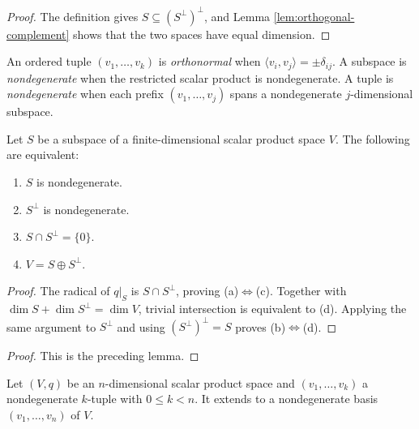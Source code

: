 \begin{proof}
\leanok
{}
\sketch The definition gives $S\subseteq(S^\perp)^\perp$, and Lemma
\ref{lem:orthogonal-complement} shows that the two spaces have equal dimension.
\end{proof}

An ordered tuple $(v_1,\ldots,v_k)$ is \emph{orthonormal} when
$\langle v_i,v_j\rangle=\pm\delta_{ij}$. A subspace is \emph{nondegenerate} when
the restricted scalar product is nondegenerate. A tuple is \emph{nondegenerate}
when each prefix $(v_1,\ldots,v_j)$ spans a nondegenerate $j$-dimensional
subspace.

\begin{lemma}\label{lem:nondegenerate-subspace}
\leanok
{}
Let $S$ be a subspace of a finite-dimensional scalar product space $V$. The
following are equivalent:
\begin{enumerate}[label=(\alph*)]
\item $S$ is nondegenerate.
\item $S^\perp$ is nondegenerate.
\item $S\cap S^\perp=\{0\}$.
\item $V=S\oplus S^\perp$.
\end{enumerate}
\end{lemma}

\begin{proof}
\leanok
{}
\sketch The radical of $q|_S$ is $S\cap S^\perp$, proving (a)$\Leftrightarrow$(c).
Together with $\dim S+\dim S^\perp=\dim V$, trivial intersection is equivalent to
(d). Applying the same argument to $S^\perp$ and using
$(S^\perp)^\perp=S$ proves (b)$\Leftrightarrow$(d).
\end{proof}

\begin{proof}
\leanok
\sketch This is the preceding lemma.
\end{proof}

\begin{lemma}\label{lem:completion-nondegenerate-bases}
\leanok
{}
Let $(V,q)$ be an $n$-dimensional scalar product space and
$(v_1,\ldots,v_k)$ a nondegenerate $k$-tuple with $0\leq k<n$. It extends to a
nondegenerate basis $(v_1,\ldots,v_n)$ of $V$.
\end{lemma}


